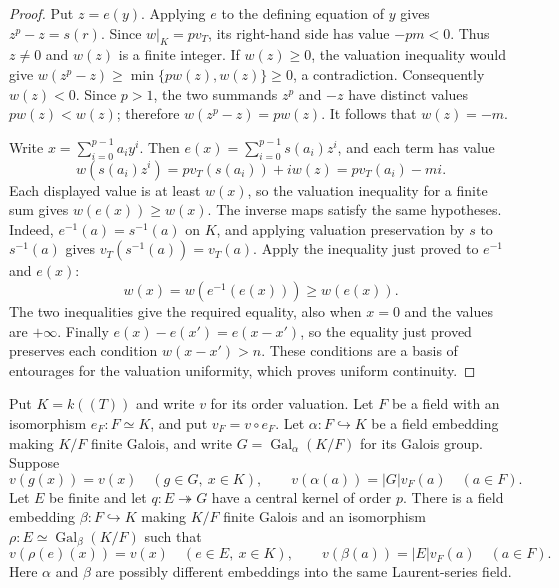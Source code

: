\begin{proof}
Put $z=e(y)$. Applying $e$ to the defining equation of $y$
gives $z^p-z=s(r)$. Since $w|_K=pv_T$, its right-hand side
has value $-pm<0$. Thus $z\ne0$ and $w(z)$ is a finite integer.
If $w(z)\ge0$, the valuation inequality would give
$w(z^p-z)\ge\min\{pw(z),w(z)\}\ge0$, a contradiction.
Consequently $w(z)<0$. Since $p>1$, the two summands
$z^p$ and $-z$ have distinct values $pw(z)<w(z)$;
therefore $w(z^p-z)=pw(z)$. It follows that $w(z)=-m$.

Write $x=\sum_{i=0}^{p-1}a_i y^i$. Then
$e(x)=\sum_{i=0}^{p-1}s(a_i)z^i$, and each term has value
\[
 w(s(a_i)z^i)=pv_T(s(a_i))+i w(z)=pv_T(a_i)-mi.
\]
Each displayed value is at least $w(x)$, so the valuation
inequality for a finite sum gives $w(e(x))\ge w(x)$.
The inverse maps satisfy the same hypotheses. Indeed,
$e^{-1}(a)=s^{-1}(a)$ on $K$, and applying valuation preservation
by $s$ to $s^{-1}(a)$ gives $v_T(s^{-1}(a))=v_T(a)$.
Apply the inequality just proved to $e^{-1}$ and $e(x)$:
\[
 w(x)=w(e^{-1}(e(x)))\ge w(e(x)).
\]
The two inequalities give the required equality, also when
$x=0$ and the values are $+\infty$.
Finally $e(x)-e(x')=e(x-x')$, so the equality just proved
preserves each condition $w(x-x')>n$. These conditions are
a basis of entourages for the valuation uniformity, which
proves uniform continuity.
\end{proof}


\begin{theorem}
\label{thm:witt-laurent-central-lift}
\leanok
Put $K=k((T))$ and write $v$ for its order valuation.
Let $F$ be a field with an isomorphism $e_F:F\simeq K$, and put
$v_F=v\circ e_F$. Let $\alpha:F\hookrightarrow K$ be a field
embedding making $K/F$ finite Galois, and write
$G=\operatorname{Gal}_{\alpha}(K/F)$ for its Galois group.
Suppose
\[
 v(g(x))=v(x)\quad(g\in G,\ x\in K),\qquad
 v(\alpha(a))=|G|v_F(a)\quad(a\in F).
\]
Let $E$ be finite and let $q:E\twoheadrightarrow G$ have a
central kernel of order $p$. There is a field embedding
$\beta:F\hookrightarrow K$ making $K/F$ finite Galois and an
isomorphism $\rho:E\simeq\operatorname{Gal}_{\beta}(K/F)$ such that
\[
 v(\rho(e)(x))=v(x)\quad(e\in E,\ x\in K),\qquad
 v(\beta(a))=|E|v_F(a)\quad(a\in F).
\]
Here $\alpha$ and $\beta$ are possibly different embeddings into
the same Laurent-series field.
\end{theorem}

